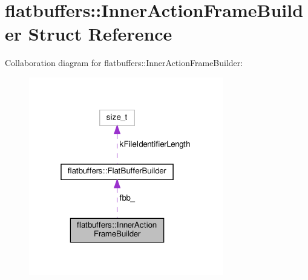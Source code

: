\hypertarget{structflatbuffers_1_1InnerActionFrameBuilder}{}\section{flatbuffers\+:\+:Inner\+Action\+Frame\+Builder Struct Reference}
\label{structflatbuffers_1_1InnerActionFrameBuilder}


Collaboration diagram for flatbuffers\+:\+:Inner\+Action\+Frame\+Builder\+:
\nopagebreak
\begin{figure}[H]
\begin{center}
\leavevmode
\includegraphics[width=241pt]{structflatbuffers_1_1InnerActionFrameBuilder__coll__graph}
\end{center}
\end{figure}
